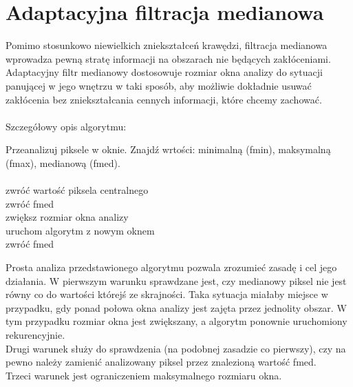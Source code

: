 \documentclass[a4paper,12pt,oneside,notitlepage,onecolumn]{article}
\begin{document}
\section{Adaptacyjna filtracja medianowa}
Pomimo stosunkowo niewielkich zniekształceń krawędzi, filtracja medianowa wprowadza pewną stratę informacji na obszarach nie będących zakłóceniami.
Adaptacyjny filtr medianowy dostosowuje rozmiar okna analizy do sytuacji panującej w jego wnętrzu w taki sposób, aby możliwie dokładnie usuwać zakłócenia bez zniekształcania cennych informacji, które chcemy zachować.
\\\\Szczegółowy opis algorytmu:
\begin{algorithm}[H]
\begin{algorithmic}
  \item Przeanalizuj piksele w oknie. Znajdź wrtości: minimalną (fmin), maksymalną (fmax), medianową (fmed).\\
    \\
	\hspace{\algorithmicindent}\hspace{\algorithmicindent}zwróć wartość piksela centralnego
    \Else
	\\\hspace{\algorithmicindent}\hspace{\algorithmicindent}zwróć fmed
    \EndIf
  \Else
    \\\hspace{\algorithmicindent}zwiększ rozmiar okna analizy
    \\
	\hspace{\algorithmicindent}\hspace{\algorithmicindent}uruchom algorytm z nowym oknem
    \Else
	\\\hspace{\algorithmicindent}\hspace{\algorithmicindent}zwróć fmed
    \EndIf
  \EndIf
	\end{algorithmic}
\end{algorithm}
Prosta analiza przedstawionego algorytmu pozwala zrozumieć zasadę i cel jego działania. 
W pierwszym warunku sprawdzane jest, czy medianowy piksel nie jest równy co do wartości którejś ze skrajności. 
Taka sytuacja miałaby miejsce w przypadku, gdy ponad połowa okna analizy jest zajęta przez jednolity obszar. 
W tym przypadku rozmiar okna jest zwiększany, a algorytm ponownie uruchomiony rekurencyjnie.\\
Drugi warunek służy do sprawdzenia (na podobnej zasadzie co pierwszy), czy na pewno należy zamienić analizowany piksel przez znalezioną wartość fmed.\\
Trzeci warunek jest ograniczeniem maksymalnego rozmiaru okna.
\end{document}
